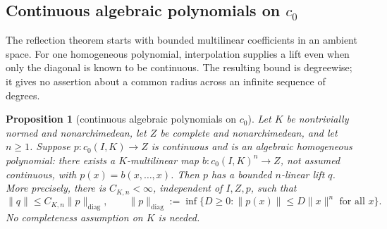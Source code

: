 \documentclass[11pt]{amsart}
\newtheorem{proposition}[theorem]{Proposition}
\theoremstyle{definition}
\theoremstyle{remark}
\numberwithin{equation}{section}
\newcommand{\norm}[1]{\lVert #1\rVert}
\begin{document}
\subsection{Continuous algebraic polynomials on \texorpdfstring{$c_0$}{c0}}
The reflection theorem starts with bounded multilinear coefficients in an ambient space. For one
homogeneous polynomial, interpolation supplies a lift even when only the diagonal is known to be
continuous. The resulting bound is degreewise; it gives no assertion about a common radius across
an infinite sequence of degrees.

\begin{proposition}[continuous algebraic polynomials on $c_0$]\label{fam:prop:c0-algebraic}
Let $K$ be nontrivially normed and nonarchimedean, let $Z$ be complete and nonarchimedean, and let
$n\ge1$. Suppose $p\colon c_0(I,K)\to Z$ is continuous and is an algebraic homogeneous polynomial:
there exists a $K$\nobreakdash-multilinear map $b\colon c_0(I,K)^n\to Z$, not assumed continuous,
with $p(x)=b(x,\ldots,x)$. Then $p$ has a bounded $n$\nobreakdash-linear lift $q$. More precisely,
there is $C_{K,n}<\infty$, independent of $I,Z,p$, such that
\[
 \norm q\le C_{K,n}\norm p_{\mathrm{diag}},\qquad
 \norm p_{\mathrm{diag}}:=\inf\{D\ge0:\norm{p(x)}\le D\norm x^n\text{ for all }x\}.
\]
No completeness assumption on $K$ is needed.
\end{proposition}
\end{document}
